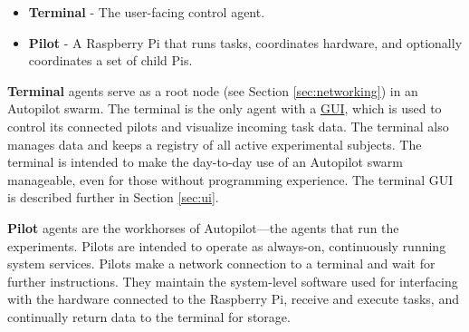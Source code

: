 \begin{itemize}
    \item \textbf{Terminal} - The user-facing control agent.
    \item \textbf{Pilot} - A Raspberry Pi that runs tasks, coordinates hardware, and optionally coordinates a set of child Pis.
\end{itemize}



\textbf{Terminal} agents serve as a root node (see Section \ref{sec:networking}) in an Autopilot swarm. The terminal is the only agent with a \hyperref[sec:ui]{GUI}, which is used to control its connected pilots and visualize incoming task data. The terminal also manages data and keeps a registry of all active experimental subjects. The terminal is intended to make the day-to-day use of an Autopilot swarm manageable, even for those without programming experience. The terminal GUI is described further in Section \ref{sec:ui}.

\textbf{Pilot} agents are the workhorses of Autopilot---the agents that run the experiments. Pilots are intended to operate as always-on, continuously running system services. Pilots make a network connection to a terminal and wait for further instructions. They maintain the system-level software used for interfacing with the hardware connected to the Raspberry Pi, receive and execute tasks, and continually return data to the terminal for storage.


